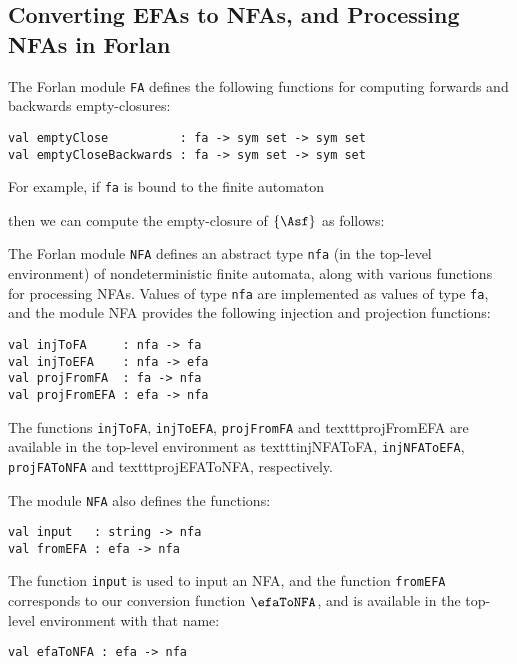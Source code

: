 \subsection{Converting EFAs to NFAs, and
Processing NFAs in Forlan}

The Forlan module \texttt{FA} defines the following functions
for computing forwards and backwards empty-closures:
\begin{verbatim}
val emptyClose          : fa -> sym set -> sym set
val emptyCloseBackwards : fa -> sym set -> sym set
\end{verbatim}
For example, if \texttt{fa} is bound to the finite automaton
\begin{center}

\end{center}
then we can compute the empty-closure of $\{\Asf\}$ as follows:


The Forlan module \texttt{NFA} defines an abstract type \texttt{nfa}
(in the top-level environment) of nondeterministic finite automata,
along with various functions for processing NFAs.  Values of type
\texttt{nfa} are implemented as values of type \texttt{fa}, and the
module NFA provides the following injection and projection functions:
\begin{verbatim}
val injToFA     : nfa -> fa
val injToEFA    : nfa -> efa
val projFromFA  : fa -> nfa
val projFromEFA : efa -> nfa
\end{verbatim}
The functions \texttt{injToFA}, \texttt{injToEFA}, \texttt{projFromFA} and
texttt{projFromEFA} are available in the top-level environment as
texttt{injNFAToFA}, \texttt{injNFAToEFA}, \texttt{projFAToNFA} and
texttt{projEFAToNFA}, respectively.

The module \texttt{NFA} also defines the functions:
\begin{verbatim}
val input   : string -> nfa
val fromEFA : efa -> nfa
\end{verbatim}
The function \texttt{input} is used to input an NFA, and
the function \texttt{fromEFA} corresponds to our
conversion function $\efaToNFA$, and is available in the top-level
environment with that name:
\begin{verbatim}
val efaToNFA : efa -> nfa
\end{verbatim}


